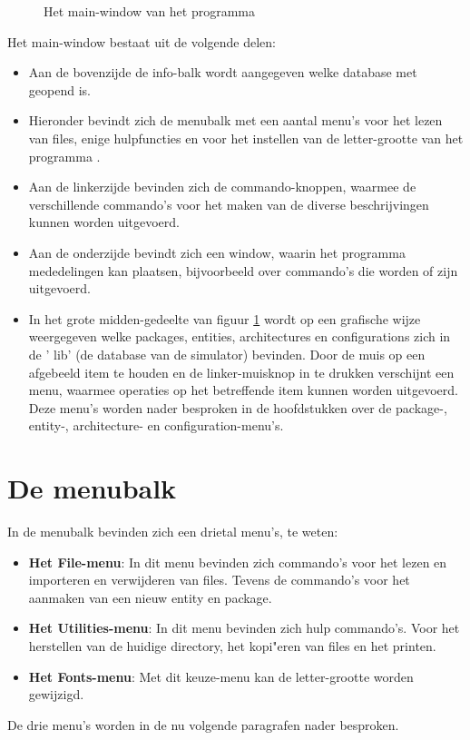 \begin{figure}[htb]
  \centerline{}
  \caption{Het main-window van het programma }
  \label{main-window}
\end{figure}

Het main-window bestaat uit de volgende delen:
\begin{itemize}
\item Aan de bovenzijde de info-balk wordt aangegeven welke database
      met  geopend is.
\item Hieronder bevindt zich de menubalk met een aantal menu's voor het lezen van
      files, enige hulpfuncties en voor het instellen van de letter-grootte van het
      programma .
\item Aan de linkerzijde bevinden zich de commando-knoppen, waarmee de
      verschillende commando's voor het maken van de diverse beschrijvingen
      kunnen worden uitgevoerd.
\item Aan de onderzijde bevindt zich een window, waarin het programma
      mededelingen kan plaatsen, bijvoorbeeld over commando's die worden of zijn
      uitgevoerd.
\item In het grote midden-gedeelte van figuur \ref{main-window} wordt op een grafische wijze weergegeven
      welke packages, entities, architectures en configurations zich in de ' lib'
      (de database van de simulator) bevinden.
      Door de muis op een afgebeeld item te houden en de linker-muisknop in te drukken
      verschijnt een menu, waarmee operaties op het betreffende item
      kunnen worden uitgevoerd. Deze menu's worden nader besproken in de
      hoofdstukken over de package-, entity-, architecture- en configuration-menu's.
\end{itemize}

\section{De menubalk}
In de menubalk bevinden zich een drietal menu's, te weten:
\begin{itemize}
\item {\bf Het File-menu}: In dit menu
bevinden zich commando's voor het lezen en importeren en verwij\-deren van files.
Tevens de commando's voor het aanmaken van een nieuw entity en package.
\item {\bf Het Utilities-menu}: In dit menu bevinden zich hulp commando's.
Voor het herstellen van de huidige directory, het kopi"eren van files en het printen.
\item {\bf Het Fonts-menu}: Met dit keuze-menu kan de letter-grootte worden gewijzigd.
\end{itemize}
De drie menu's worden in de nu volgende paragrafen nader besproken.

